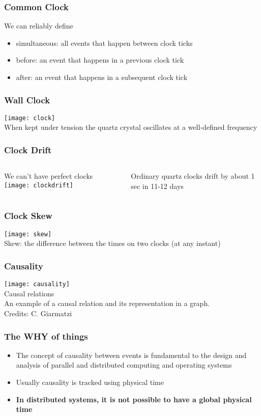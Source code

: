 \documentclass[aspectratio=169, 15pt]{beamer}
\begin{document}
{	\begin{gdblank}
		\frametitle{Common Clock}
		\LARGE
		We can reliably define
		\pause
		\begin{itemize}
			\item simultaneous: all events that happen between clock ticks
			\item before: an event that happens in a previous clock tick
			\item after: an event that happens in a subsequent clock tick
		\end{itemize}
	\end{gdblank}
	\begin{gdblank}
		\frametitle{Wall Clock}
		\centering
		\texttt{[image: clock]}
		\\When kept under tension the quartz crystal oscillates at a well-defined frequency
	\end{gdblank}
	\begin{gdblank}
		\frametitle{Clock Drift}
		\begin{columns}
			\begin{column}{0.6\textwidth}
				We can't have perfect clocks
				\texttt{[image: clockdrift]}
			\end{column}
			\begin{column}{0.4\textwidth}
				Ordinary quartz clocks drift by about 1 sec in 11-12 days
			\end{column}
		\end{columns}
	\end{gdblank}
	\begin{gdblank}
		\frametitle{Clock Skew}
		\texttt{[image: skew]}
		\\Skew: the difference between the times on two clocks (at any instant)
	\end{gdblank}
	\begin{gdblank}
		\frametitle{Causality}
		\texttt{[image: causality]}
		\centering\\Causal relations\\An example of a causal relation and its representation in a graph. 
		\tiny \\Credits: C. Giarmatzi
	\end{gdblank}   	
	\begin{gdblank}
		\frametitle{The WHY of things}
		\begin{itemize}
			\item The concept of causality between events is fundamental to the design and analysis of parallel and distributed computing and operating systems
			\item Usually causality is tracked using physical time
			      \pause 
			      \item\bf\LARGE In distributed systems, it is not possible to have a global physical time
		\end{itemize}		
	\end{gdblank}   
	\begin{gdblank}
	\end{gdblank}
		
}
\end{document}
